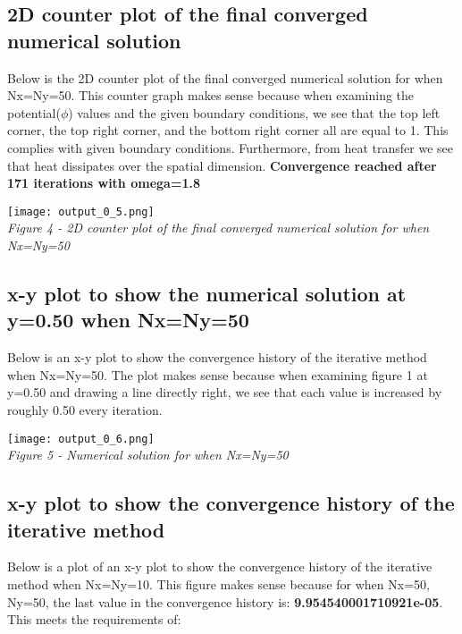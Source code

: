 \documentclass[a4paper, twoside]{article}
\begin{document}
\subsection{2D counter plot of the final converged numerical solution}
Below is the 2D counter plot of the final converged numerical solution for when Nx=Ny=50. This counter graph makes sense because when examining the potential($\phi$) values and the given boundary conditions, we see that the top left corner, the top right corner, and the bottom right corner all are equal to 1. This complies with given boundary conditions. Furthermore, from heat transfer we see that heat dissipates over the spatial dimension. \textbf{Convergence reached after 171 iterations with omega=1.8} \\

\begin{center}
    \texttt{[image: output\_0\_5.png]} \\
    \textit{Figure 4 - 2D counter plot of the final converged numerical solution for when Nx=Ny=50}
\end{center}

\newpage 
\subsection{x-y plot to show the numerical solution at y=0.50 when Nx=Ny=50}
Below is an x-y plot to show the convergence history of the iterative method when Nx=Ny=50. The plot makes sense because when examining figure 1 at y=0.50 and drawing a line directly right, we see that each value is increased by roughly 0.50 every iteration.  \\

\begin{center}
    \texttt{[image: output\_0\_6.png]} \\
    \textit{Figure 5 - Numerical solution for when Nx=Ny=50}
\end{center}

\newpage 
\subsection{x-y plot to show the convergence history of the iterative method}
Below is a plot of an x-y plot to show the convergence history of the iterative method when Nx=Ny=10. This figure makes sense because for when Nx=50, Ny=50, the last value in the convergence history is: \textbf{9.954540001710921e-05}. This meets the requirements of: \\
\end{document}
